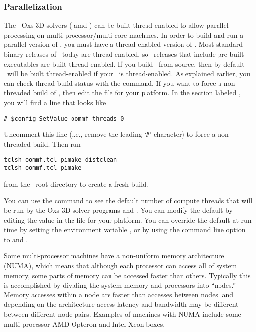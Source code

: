 \subsubsection{Parallelization}%
\label{sec:parallel}
The \OOMMF\ Oxs 3D solvers ( amd ) can be built
thread-enabled to allow parallel processing on
multi-processor/multi-core machines.  In order to build and run a
parallel version of \OOMMF, you must have a thread-enabled version of
\Tcl.  Most standard binary releases of \Tcl\ today are thread-enabled,
so \OOMMF\ releases that include pre-built executables are built
thread-enabled.  If you build \OOMMF\ from source, then by default
\OOMMF\ will be built thread-enabled if your \Tcl\ is thread-enabled.
As explained earlier, you can check thread build status with the
 command.  If you want to force a
non-threaded build of \OOMMF, then edit the  file
for your platform.  In the section labeled , you
will find a line that looks like
\begin{verbatim}
# $config SetValue oommf_threads 0
\end{verbatim}
Uncomment this line (i.e., remove the leading `\verb+#+' character) to
force a non-threaded build.  Then run
\begin{verbatim}
tclsh oommf.tcl pimake distclean
tclsh oommf.tcl pimake
\end{verbatim}
from the \OOMMF\ root directory to create a fresh build.

You can use the  command to see the
default number of compute threads that will be run by the Oxs 3D solver
programs  and .  You can modify the default by
editing the  value in the
 file for your platform.  You can override the
default at run time by setting the environment variable
, or by
using the command line option  to  and
.

Some multi-processor machines have a non-uniform memory
architecture (NUMA), which means that although each processor can access
all of system memory, some parts of memory can be accessed faster than
others.  Typically this is accomplished by dividing the system memory
and processors into ``nodes.''  Memory accesses within a node are faster
than accesses between nodes, and depending on the architecture access
latency and bandwidth may be different between different node pairs.
Examples of machines with NUMA include some multi-processor AMD Opteron
and Intel Xeon boxes.

